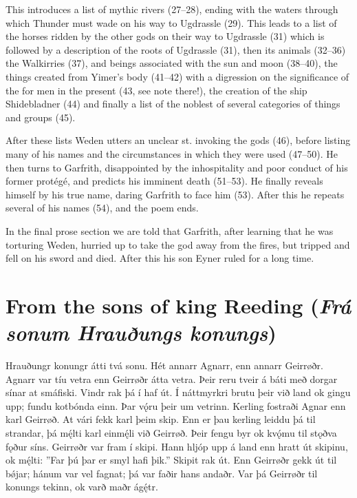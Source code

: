 This introduces a list of mythic rivers (27–28), ending with the waters through which Thunder must wade on his way to Ugdrassle (29). This leads to a list of the horses ridden by the other gods on their way to Ugdrassle (31) which is followed by a description of the roots of Ugdrassle (31), then its animals (32–36) the Walkirries (37), and beings associated with the sun and moon (38–40), the things created from Yimer’s body (41–42) with a digression on the significance of the  for men in the present (43, see note there!), the creation of the ship Shidebladner (44) and finally a list of the noblest of several categories of things and groups (45).

After these lists Weden utters an unclear st. invoking the gods (46), before listing many of his names and the circumstances in which they were used (47–50). He then turns to Garfrith, disappointed by the inhospitality and poor conduct of his former protégé, and predicts his imminent death (51–53). He finally reveals himself by his true name, daring Garfrith to face him (53). After this he repeats several of his names (54), and the poem ends.

In the final prose section we are told that Garfrith, after learning that he was torturing Weden, hurried up to take the god away from the fires, but tripped and fell on his sword and died. After this his son Eyner ruled for a long time.

\sectionline

\section{From the sons of king Reeding (\emph{Frá sonum Hrauðungs konungs})}

\bpg
\bpa[1a]Hrauðungr konungr átti tvá sonu. Hét annarr Agnarr, enn annarr Geirrøðr.
Agnarr var tíu vetra enn Geirrøðr átta vetra. Þeir reru tveir á báti með dorgar sínar at smáfiski.
Vindr rak þá í haf út. Í náttmyrkri brutu þeir við land ok gingu upp; fundu kotbónda einn.
Þar vǫ́ru þeir um vetrinn. Kerling fostraði Agnar enn karl Geirrøð.
At vári fekk karl þeim skip. Enn er þau kerling leiddu þá til strandar, þá mę́lti karl einmę́li við Geirrøð.
Þeir fengu byr ok kvǫ́mu til stǫðva fǫður síns. Geirrøðr var fram í skipi.
Hann hljóp upp á land enn hratt út skipinu, ok mę́lti: ”Far þú þar er smyl hafi þik.”
Skipit rak út. Enn Geirrøðr gekk út til bǿjar; hánum var vel fagnat; þá var faðir hans andaðr.
Var þá Geirrøðr til konungs tekinn, ok varð maðr ágę́tr.\epa

